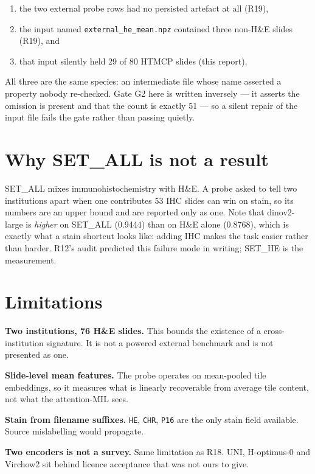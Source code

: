\documentclass[11pt,a4paper]{article}
\begin{document}
\begin{enumerate}[leftmargin=1.4em,itemsep=2pt]
\item the two external probe rows had no persisted artefact at all (R19),
\item the input named \texttt{external\_he\_mean.npz} contained three non-H\&E slides (R19), and
\item that input silently held 29 of 80 HTMCP slides (this report).
\end{enumerate}

All three are the same species: an intermediate file whose name asserted a property nobody
re-checked. Gate G2 here is written inversely --- it asserts the omission is present and that the
count is exactly 51 --- so a silent repair of the input file fails the gate rather than passing
quietly.

\section{Why SET\_ALL is not a result}

SET\_ALL mixes immunohistochemistry with H\&E. A probe asked to tell two institutions apart when one
contributes 53 IHC slides can win on stain, so its numbers are an upper bound and are reported only
as one. Note that dinov2-large is \emph{higher} on SET\_ALL (0.9444) than on H\&E alone (0.8768),
which is exactly what a stain shortcut looks like: adding IHC makes the task easier rather than
harder. R12's audit predicted this failure mode in writing; SET\_HE is the measurement.

\section{Limitations}

\textbf{Two institutions, 76 H\&E slides.} This bounds the existence of a cross-institution
signature. It is not a powered external benchmark and is not presented as one.

\textbf{Slide-level mean features.} The probe operates on mean-pooled tile embeddings, so it
measures what is linearly recoverable from average tile content, not what the attention-MIL sees.

\textbf{Stain from filename suffixes.} \texttt{HE}, \texttt{CHR}, \texttt{P16} are the only stain
field available. Source mislabelling would propagate.

\textbf{Two encoders is not a survey.} Same limitation as R18. UNI, H-optimus-0 and Virchow2 sit
behind licence acceptance that was not ours to give.
\end{document}
